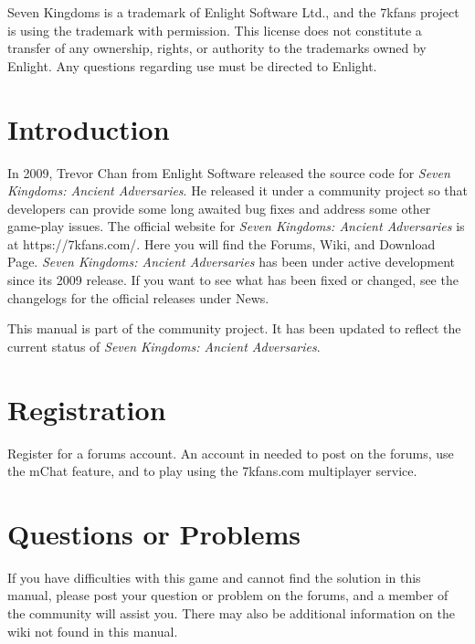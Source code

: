 \documentclass[openany]{book}
\begin{document}
Seven Kingdoms is a trademark of Enlight Software Ltd., and the 7kfans project is using the trademark with permission. This license does not constitute a transfer of any ownership, rights, or authority to the trademarks owned by Enlight. Any questions regarding use must be directed to Enlight.

\clearpage

\section{Introduction}

In 2009, Trevor Chan from Enlight Software released the source code for \textit{Seven Kingdoms: Ancient Adversaries}. He released it under a community project so that developers can provide some long awaited bug fixes and address some other game-play issues. The official website for \textit{Seven Kingdoms: Ancient Adversaries} is at https://7kfans.com/. Here you will find the Forums, Wiki, and Download Page. \textit{Seven Kingdoms: Ancient Adversaries} has been under active development since its 2009 release. If you want to see what has been fixed or changed, see the changelogs for the official releases under News. 

This manual is part of the community project. It has been updated to reflect the current status of \textit{Seven Kingdoms: Ancient Adversaries}.

\section{Registration}


Register for a forums account. An account in needed to post on the forums, use the mChat feature, and to play using the 7kfans.com multiplayer service.

\section{Questions or Problems}

If you have difficulties with this game and cannot find the solution in this manual, please post your question or problem on the forums, and a member of the community will assist you. There may also be additional information on the wiki not found in this manual.

\tableofcontents

\mainmatter























\backmatter

\cleardoublepage
{}
\printindex
\end{document}
